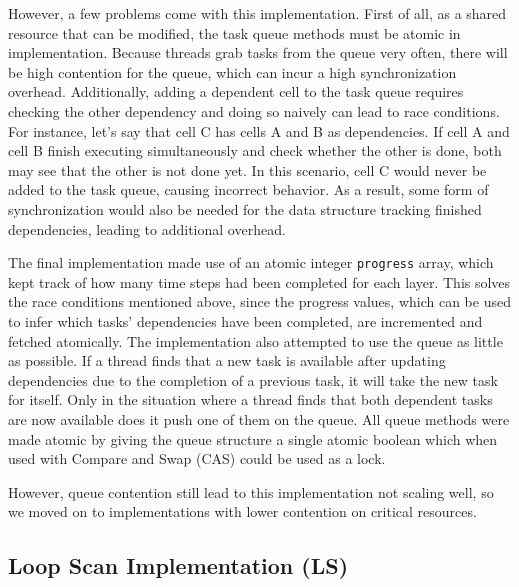 \documentclass[12pt]{article}
\begin{document}
However, a few problems come with this implementation.
First of all, as a shared resource that can be modified, the task queue methods must be atomic in implementation.
Because threads grab tasks from the queue very often, there will be high contention for the queue, which can incur a high synchronization overhead.
Additionally, adding a dependent cell to the task queue requires checking the other dependency and doing so naively can lead to race conditions.
For instance, let's say that cell C has cells A and B as dependencies.
If cell A and cell B finish executing simultaneously and check whether the other is done, both may see that the other is not done yet.
In this scenario, cell C would never be added to the task queue, causing incorrect behavior.
As a result, some form of synchronization would also be needed for the data structure tracking finished dependencies, leading to additional overhead.

The final implementation made use of an atomic integer \verb|progress| array, which kept track of how many time steps had been completed for each layer. This solves the race conditions mentioned above, since the progress values, which can be used to infer which tasks' dependencies have been completed, are incremented and fetched atomically.  The implementation also attempted to use the queue as little as possible. If a thread finds that a new task is available after updating dependencies due to the completion of a previous task, it will take the new task for itself. Only in the situation where a thread finds that both dependent tasks are now available does it push one of them on the queue. All queue methods were made atomic by giving the queue structure a single atomic boolean which when used with Compare and Swap (CAS) could be used as a lock. 

However, queue contention still lead to this implementation not scaling well, so we moved on to implementations with lower contention on critical resources.

\subsection{Loop Scan Implementation (LS)}
\end{document}
